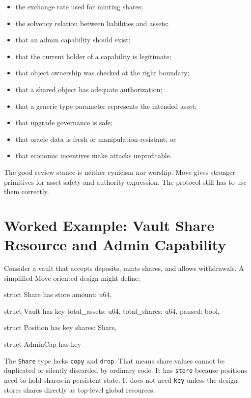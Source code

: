 \begin{itemize}
\item the exchange rate used for minting shares;
\item the solvency relation between liabilities and assets;
\item that an admin capability should exist;
\item that the current holder of a capability is legitimate;
\item that object ownership was checked at the right boundary;
\item that a shared object has adequate authorization;
\item that a generic type parameter represents the intended asset;
\item that upgrade governance is safe;
\item that oracle data is fresh or manipulation-resistant; or
\item that economic incentives make attacks unprofitable.
\end{itemize}

The good review stance is neither cynicism nor worship. Move gives stronger primitives for asset safety and authority expression. The protocol still has to use them correctly.

\section{Worked Example: Vault Share Resource and Admin Capability}

Consider a vault that accepts deposits, mints shares, and allows withdrawals. A simplified Move-oriented design might define:

\begin{codeblock}
struct Share has store {
    amount: u64,
}

struct Vault has key {
    total_assets: u64,
    total_shares: u64,
    paused: bool,
}

struct Position has key {
    shares: Share,
}

struct AdminCap has key {}
\end{codeblock}

The \texttt{Share} type lacks \texttt{copy} and \texttt{drop}. That means share values cannot be duplicated or silently discarded by ordinary code. It has \texttt{store} because positions need to hold shares in persistent state. It does not need \texttt{key} unless the design stores shares directly as top-level global resources.

